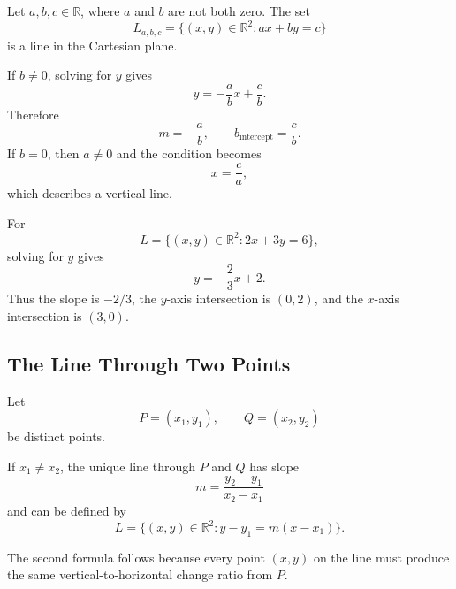 \begin{definitionbox}
Let $a,b,c\in\mathbb{R}$, where $a$ and $b$ are not both zero. The set
\[
L_{a,b,c}=\{(x,y)\in\mathbb{R}^2:ax+by=c\}
\]
is a line in the Cartesian plane.
\end{definitionbox}

If $b\neq 0$, solving for $y$ gives
\[
y=-\frac{a}{b}x+\frac{c}{b}.
\]
Therefore
\[
\boxed{m=-\frac{a}{b}},
\qquad
\boxed{b_{\mathrm{intercept}}=\frac{c}{b}}.
\]
If $b=0$, then $a\neq 0$ and the condition becomes
\[
x=\frac{c}{a},
\]
which describes a vertical line.

\begin{examplebox}
For
\[
L=\{(x,y)\in\mathbb{R}^2:2x+3y=6\},
\]
solving for $y$ gives
\[
y=-\frac23x+2.
\]
Thus the slope is $-2/3$, the $y$-axis intersection is $(0,2)$, and the
$x$-axis intersection is $(3,0)$.
\end{examplebox}

\subsection{The Line Through Two Points}

Let
\[
P=(x_1,y_1),
\qquad
Q=(x_2,y_2)
\]
be distinct points.

\begin{theorembox}
If $x_1\neq x_2$, the unique line through $P$ and $Q$ has slope
\[
\boxed{m=\frac{y_2-y_1}{x_2-x_1}}
\]
and can be defined by
\[
\boxed{L=\{(x,y)\in\mathbb{R}^2:y-y_1=m(x-x_1)\}}.
\]
\end{theorembox}

\begin{center}
\end{center}

The second formula follows because every point $(x,y)$ on the line must produce
the same vertical-to-horizontal change ratio from $P$.

